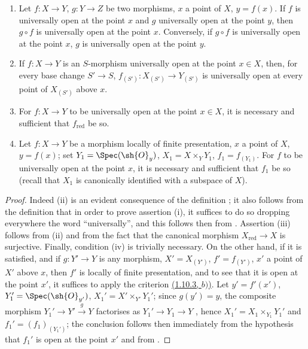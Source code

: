 \begin{proposition}[14.3.4]
\label{IV.14.3.4}
\begin{enumerate}[label=(\roman*)]
  \item Let $f:X\to Y$, $g:Y\to Z$ be two morphisms, $x$ a point of $X$, $y=f(x)$.
  If $f$ is universally open at the point $x$ and $g$ universally open at the point $y$, then $g\circ f$ is universally open at the point $x$.
  Conversely, if $g\circ f$ is universally open at the point $x$, $g$ is universally open at the point $y$.

  \item If $f:X\to Y$ is an $S$-morphism universally open at the point $x\in X$, then, for every base change $S'\to S$, $f_{(S')}:X_{(S')}\to Y_{(S')}$ is universally open at every point of $X_{(S')}$ above $x$.

  \item For $f:X\to Y$ to be universally open at the point $x\in X$, it is necessary and sufficient that $f_{\mathrm{red}}$ be so.

  \item Let $f:X\to Y$ be a morphism locally of finite presentation, $x$ a point of $X$, $y=f(x)$; set $Y_1=\Spec(\sh{O}_y)$, $X_1=X\times_Y Y_1$, $f_1=f_{(Y_1)}$.
  For $f$ to be universally open at the point $x$, it is necessary and sufficient that $f_1$ be so (recall  that $X_1$ is canonically identified with a subspace of $X$).
\end{enumerate}
\end{proposition}

\begin{proof}
Indeed (ii) is an evident consequence of the definition ; it also follows from the definition that in order to prove assertion (i), it suffices to do so dropping everywhere the word ``universally'', and this follows then from .
Assertion (iii) follows from (ii) and from the fact that the canonical morphism $X_{\mathrm{red}}\to X$ is surjective.
Finally, condition (iv) is trivially necessary.
On the other hand, if it is satisfied, and if $g:Y'\to Y$ is any morphism, $X'=X_{(Y')}$, $f'=f_{(Y')}$, $x'$ a point of $X'$ above $x$, then $f'$ is locally of finite presentation, and to see that it is open at the point $x'$, it suffices to apply the criterion \hyperref[IV.1.10.3]{(1.10.3, $b)$)}.
Let $y'=f'(x')$, $Y_1'=\Spec(\sh{O}_{y'})$, $X_1'=X'\times_{Y'}Y_1'$; since $g(y')=y$, the composite morphism $Y_1'\to Y'\xrightarrow{g}Y$ factorises as $Y_1'\to Y_1\to Y$ , hence $X_1'=X_1\times_{Y_1}Y_1'$ and $f_1'=(f_1)_{(Y_1')}$; the conclusion follows then immediately from the hypothesis that $f_1'$ is open at the point $x'$ and from .
\end{proof}

